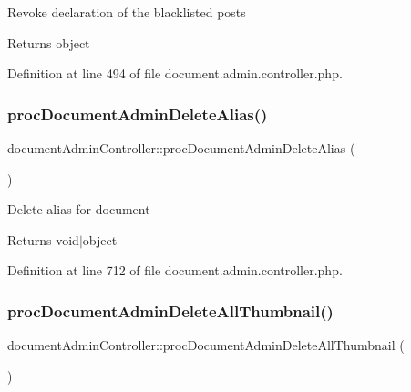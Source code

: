 Revoke declaration of the blacklisted posts \begin{DoxyReturn}{Returns}
object 
\end{DoxyReturn}


Definition at line 494 of file document.\+admin.\+controller.\+php.

\mbox{\label{classdocumentAdminController_ab2f0c552145e0a56841e0aa7e8e03ae7}} 
\subsubsection{\texorpdfstring{proc\+Document\+Admin\+Delete\+Alias()}{procDocumentAdminDeleteAlias()}}
{\footnotesize\ttfamily document\+Admin\+Controller\+::proc\+Document\+Admin\+Delete\+Alias (\begin{DoxyParamCaption}{ }\end{DoxyParamCaption})}

Delete alias for document \begin{DoxyReturn}{Returns}
void$\vert$object 
\end{DoxyReturn}


Definition at line 712 of file document.\+admin.\+controller.\+php.

\mbox{\label{classdocumentAdminController_a9ff3a9934c8bfa4d2ded4287920c0362}} 
\subsubsection{\texorpdfstring{proc\+Document\+Admin\+Delete\+All\+Thumbnail()}{procDocumentAdminDeleteAllThumbnail()}}
{\footnotesize\ttfamily document\+Admin\+Controller\+::proc\+Document\+Admin\+Delete\+All\+Thumbnail (\begin{DoxyParamCaption}{ }\end{DoxyParamCaption})}

